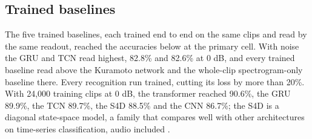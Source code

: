 \documentclass[10pt]{article}
\begin{document}
\subsection{Trained baselines}\label{trained-baselines}

The five trained baselines, each trained end to end on the same clips
and read by the same readout, reached the accuracies below at the
primary cell. With noise the GRU and TCN read highest, 82.8\% and 82.6\%
at 0 dB, and every trained baseline read above the Kuramoto network and
the whole-clip spectrogram-only baseline there. Every recognition run
trained, cutting its loss by more than 20\%. With 24,000 training clips
at 0 dB, the transformer reached 90.6\%, the GRU 89.9\%, the TCN 89.7\%,
the S4D 88.5\% and the CNN 86.7\%; the S4D is a diagonal state-space
model, a family that compares well with other architectures on
time-series classification, audio included \citep{saadatmand2026}.
\end{document}

